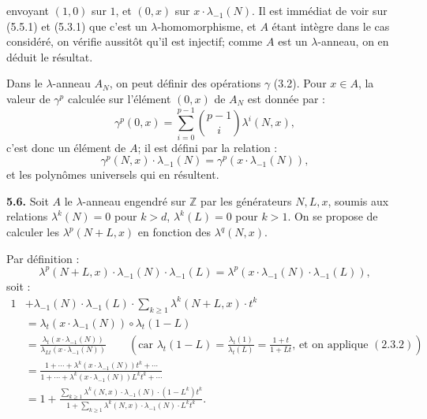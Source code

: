 envoyant \((1,0)\) sur \(1\), et \((0,x)\) sur \(x\cdot\lambda_{-1}(N)\). Il est immédiat de voir sur (5.5.1) et (5.3.1) que c'est un \(\lambda\)-homomorphisme, et \(A\) étant intègre dans le cas considéré, on vérifie aussitôt qu'il est injectif; comme \(A\) est un \(\lambda\)-anneau, on en déduit le résultat.

Dans le \(\lambda\)-anneau \(A_N\), on peut définir des opérations \(\gamma\) (3.2). Pour \(x\in A\), la valeur de \(\gamma^p\) calculée sur l'élément \((0,x)\) de \(A_N\) est donnée par :
\[
  \gamma^p(0,x)=\sum_{i=0}^{p-1}\binom{p-1}{i}\lambda^i(N,x),
\]
c'est donc un élément de \(A\); il est défini par la relation :
\begin{equation}\tag{5.5.4}
  \gamma^p(N,x)\cdot\lambda_{-1}(N)=\gamma^p(x\cdot\lambda_{-1}(N)),
\end{equation}
et les polynômes universels qui en résultent.


\textbf{5.6.} Soit \(A\) le \(\lambda\)-anneau engendré sur \(\mathbb Z\) par les générateurs \(N,L,x\), soumis aux relations \(\lambda^k(N)=0\) pour \(k>d\), \(\lambda^k(L)=0\) pour \(k>1\). On se propose de calculer les \(\lambda^p(N+L,x)\) en fonction des \(\lambda^q(N,x)\).

Par définition :
\[
  \lambda^p(N+L,x)\cdot\lambda_{-1}(N)\cdot\lambda_{-1}(L)
  =\lambda^p(x\cdot\lambda_{-1}(N)\cdot\lambda_{-1}(L)),
\]
soit :
\[
\begin{aligned}
1&+\lambda_{-1}(N)\cdot\lambda_{-1}(L)\cdot\sum_{k\ge1}\lambda^k(N+L,x)\cdot t^k \\
 &=\lambda_t(x\cdot\lambda_{-1}(N))\circ \lambda_t(1-L) \\
 &=\frac{\lambda_t(x\cdot\lambda_{-1}(N))}{\lambda_{Lt}(x\cdot\lambda_{-1}(N))}
   \qquad\left(\text{car }\lambda_t(1-L)=\frac{\lambda_t(1)}{\lambda_t(L)}=\frac{1+t}{1+Lt}\text{, et on applique }(2.3.2)\right) \\
 &=\frac{1+\cdots+\lambda^k(x\cdot\lambda_{-1}(N))t^k+\cdots}{1+\cdots+\lambda^k(x\cdot\lambda_{-1}(N))L^k t^k+\cdots} \\
 &=1+\frac{\sum_{k\ge1}\lambda^k(N,x)\cdot\lambda_{-1}(N)\cdot(1-L^k)t^k}{1+\sum_{k\ge1}\lambda^k(N,x)\cdot\lambda_{-1}(N)\cdot L^k t^k}.
\end{aligned}
\]
